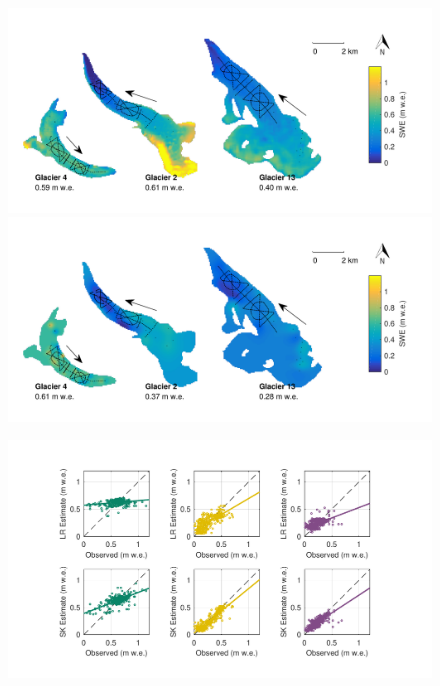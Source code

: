 \documentclass[twocolumn,letterpaper]{igs}
\begin{document}
\begin{figure}
	\centering
	\includegraphics[width =\textwidth]{LR_map.pdf}\\
    \includegraphics[width =\textwidth]{SK_map.pdf}\\
	\caption{}
	\label{fig:LR_SK_map}
\end{figure}

\begin{figure}
	\centering
	\includegraphics[width =\textwidth]{observedVSestimated_S2.pdf}\\
	\caption{}
	\label{fig:observedVSestimated_S2}
\end{figure}
\end{document}
